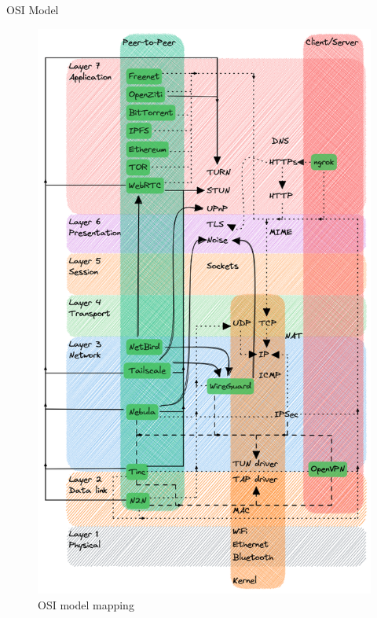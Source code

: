 \begin{frame}[fragile]{OSI Model}
\begin{figure}
\centering
\includegraphics[width=\textwidth,height=0.9\textheight]{notes/../figures/osi-map.excalidraw.png}
\caption{OSI model mapping}
\end{figure}

\newpage


\end{frame}
